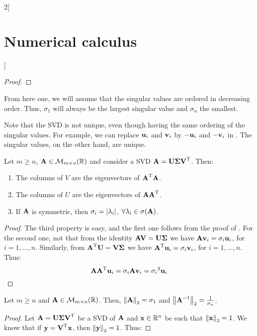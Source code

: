 \documentclass[../../../main_math.tex]{subfiles}
\begin{document}
\begin{multicols}{2}[\section{Numerical calculus}]
\begin{proof}
  \end{proof}
  \begin{remark}
    From here one, we will assume that the singular values are ordered in decreasing order. Thus, $\sigma_1$ will always be the largest singular value and $\sigma_n$ the smallest.
  \end{remark}
  \begin{remark}
    Note that the SVD is not unique, even though having the same ordering of the singular values. For example, we can replace $\boldsymbol{\mathrm{u}}_i$ and $\boldsymbol{\mathrm{v}}_i$ by $-\boldsymbol{\mathrm{u}}_i$ and $-\boldsymbol{\mathrm{v}}_i$ in . The singular values, on the other hand, are unique.
  \end{remark}
  \begin{corollary}\label{NC:svd-cor}
    Let $m\geq n$, $\boldsymbol{\mathrm{A}}\in\mathcal{M}_{m\times n}(\mathbb{R})$ and consider a SVD $\boldsymbol{\mathrm{A}}=\boldsymbol{\mathrm{U}}\boldsymbol{\mathrm{\Sigma}}{\boldsymbol{\mathrm{V}}}^{\mathrm{T}}$. Then:
    \begin{enumerate}
      \item The columns of $V$ are the eigenvectors of ${\boldsymbol{\mathrm{A}}}^{\mathrm{T}}\boldsymbol{\mathrm{A}}$.
      \item The columns of $U$ are the eigenvectors of $\boldsymbol{\mathrm{A}}{\boldsymbol{\mathrm{A}}}^{\mathrm{T}}$.
      \item If $\boldsymbol{\mathrm{A}}$ is symmetric, then $\sigma_i=\abs{\lambda_i}$, $\forall\lambda_i\in\sigma(\boldsymbol{\mathrm{A}})$.
    \end{enumerate}
  \end{corollary}
  \begin{proof}
    The third property is easy, and the first one follows from the proof of . For the second one, not that from the identity $\boldsymbol{\mathrm{AV}}=\boldsymbol{\mathrm{U\Sigma}}$ we have $\boldsymbol{\mathrm{A}}\boldsymbol{\mathrm{v}}_i=\sigma_i\boldsymbol{\mathrm{u}}_i$, for $i=1,\ldots,n$. Similarly, from ${\boldsymbol{\mathrm{A}}}^{\mathrm{T}}\boldsymbol{\mathrm{U}}=\boldsymbol{\mathrm{V\Sigma}}$ we have ${\boldsymbol{\mathrm{A}}}^{\mathrm{T}}\boldsymbol{\mathrm{u}}_i=\sigma_i\boldsymbol{\mathrm{v}}_i$, for $i=1,\ldots,n$. Thus:
    $$
      \boldsymbol{\mathrm{A}}{\boldsymbol{\mathrm{A}}}^{\mathrm{T}}\boldsymbol{\mathrm{u}}_i=\sigma_i\boldsymbol{\mathrm{A}}\boldsymbol{\mathrm{v}}_i={\sigma_i}^2\boldsymbol{\mathrm{u}}_i
    $$
  \end{proof}
  \begin{proposition}\label{NC:norm_svd}
    Let $m\geq n$ and $\boldsymbol{\mathrm{A}}\in\mathcal{M}_{m\times n}(\mathbb{R})$. Then, $\left\|\boldsymbol{\mathrm{A}}\right\|_2 = \sigma_1$ and $\left\|\boldsymbol{\mathrm{A}}^{-1}\right\|_2=\frac{1}{\sigma_n}$.
  \end{proposition}
  \begin{proof}
    Let $\boldsymbol{\mathrm{A}}=\boldsymbol{\mathrm{U}}\boldsymbol{\mathrm{\Sigma}}{\boldsymbol{\mathrm{V}}}^{\mathrm{T}}$ be a SVD of $\boldsymbol{\mathrm{A}}$ and $\boldsymbol{\mathrm{x}}\in\mathbb{R}^n$ be such that $\left\|\boldsymbol{\mathrm{x}}\right\|_2=1$. We know that if $\boldsymbol{\mathrm{y}}={\boldsymbol{\mathrm{V}}}^{\mathrm{T}}\boldsymbol{\mathrm{x}}$, then $\left\|\boldsymbol{\mathrm{y}}\right\|_2=1$. Thus:

\end{proof}
\end{multicols}
\end{document}

